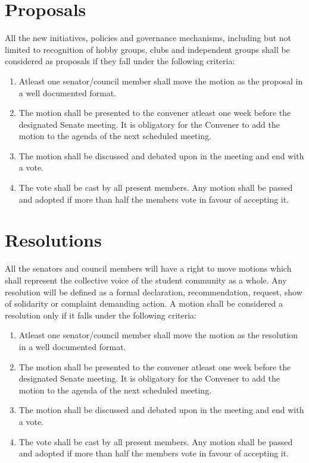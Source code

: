\documentclass[12pt]{article}
\begin{document}
\section{Proposals}
All the new initiatives, policies and governance mechanisms, including but not limited to recognition of hobby groups, clubs and independent groups shall be considered as proposals if they fall under the following criteria:
\begin{enumerate}
    \item Atleast one senator/council member shall move the motion as the proposal in a well documented format.
    \item The motion shall be presented to the convener atleast one week before the designated Senate meeting. It is obligatory for the Convener to add the motion to the agenda of the next scheduled meeting.
    \item The motion shall be discussed and debated upon in the meeting and end with a vote.
    \item The vote shall be cast by all present members. Any motion shall be passed and adopted if more than half the members vote in favour of accepting it.
\end{enumerate}


\section{Resolutions}
All the senators and council members will have a right to move motions which shall represent the collective voice of the student community as a whole. Any resolution will be defined as a formal declaration, recommendation, request, show of solidarity or complaint demanding action. A motion shall be considered a resolution only if it falls under the following criteria:
\begin{enumerate}
    \item Atleast one senator/council member shall move the motion as the resolution in a well documented format. 
    \item The motion shall be presented to the convener atleast one week before the designated Senate meeting. It is obligatory for the Convener to add the motion to the agenda of the next scheduled meeting.
    \item The motion shall be discussed and debated upon in the meeting and end with a vote.
    \item The vote shall be cast by all present members. Any motion shall be passed and adopted if more than half the members vote in favour of accepting it.
\end{enumerate}
\end{document}
